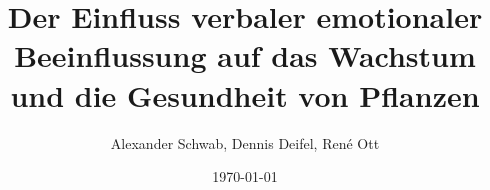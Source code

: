 \documentclass[11pt]{article}
\title{Der Einfluss verbaler emotionaler Beeinflussung auf das Wachstum und die Gesundheit von Pflanzen}
\author{Alexander Schwab, Dennis Deifel, René Ott}
\date{\today}
\begin{document}
    \maketitle
    \tableofcontents
    \pagebreak

    
    
     
    \printbibliography
\end{document}
